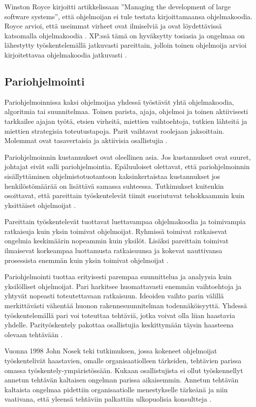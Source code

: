 \documentclass[finnish]{tktltiki2}
\theoremstyle{definition}
\theoremstyle{remark}
\begin{document}
Winston Royce kirjoitti artikkelissaan ''Managing the development of large software systems'', että ohjelmoijan ei tule testata kirjoittamaansa ohjelmakoodia. Royce arvioi, että useimmat virheet ovat ilmiselviä ja ovat löydettävissä katsomalla ohjelmakoodia \cite{ROY70}. XP:ssä tämä on hyväksytty tosiasia ja ongelmaa on lähestytty työskentelemällä jatkuvasti pareittain, jolloin toinen ohjelmoija arvioi kirjoitettavaa ohjelmakoodia jatkuvasti \cite{BEC99}. 

\subsection{Pariohjelmointi}

Pariohjelmoinnissa kaksi ohjelmoijaa yhdessä työstävät yhtä ohjelmakoodia, algoritmia tai suunnitelmaa. Toinen parista, ajaja, ohjelmoi ja toinen aktiivisesti tarkkailee ajajan työtä, etsien virheitä, miettien vaihtoehtoja, tutkien lähteitä ja miettien strategisia toteutustapoja. Parit vaihtavat roolejaan jaksoittain. Molemmat ovat tasavertaisia ja aktiivisia osallistujia \cite{WIL00}.

Pariohjelmoinnin kustannukset ovat oleellinen asia. Jos kustannukset ovat suuret, johtajat eivät salli pariohjelmointia. Epäluuloiset olettavat, että pariohjelmoinnin sisällyttäminen ohjelmistotuotantoon kaksinkertaistaa kustannukset jos henkilöstömäärää on lisättävä samassa suhteessa. Tutkimukset kuitenkin osoittavat, että pareittain työskentelevät tiimit suoriutuvat tehokkaammin kuin yksittäiset ohjelmoijat \cite{NOS98} \cite{WIL00}.

Pareittain työskentelevät tuottavat luettavampaa ohjelmakoodia ja toimivampia ratkaisuja kuin yksin toimivat ohjelmoijat. Ryhmissä toimivat ratkaisevat ongelmia keskimäärin nopeammin kuin yksilöt. Lisäksi pareittain toimivat ilmaisevat korkeampaa luottamusta ratkaisuunsa ja kokevat nauttivansa prosessista enemmän kuin yksin toimivat ohjelmoijat \cite{NOS98}.   

Pariohjelmointi tuottaa erityisesti parempaa suunnittelua ja analyysia kuin yksilölliset ohjelmoijat. Pari harkitsee huomattavasti enemmän vaihtoehtoja ja yhtyvät nopeasti toteutettavaan ratkaisuun. Ideoiden vaihto parin välillä merkittävästi vähentää huonon rakennesuunnitelman todennäköisyyttä.  Yhdessä työskentelemällä pari voi toteuttaa tehtäviä, jotka voivat olla liian haastavia yhdelle. Parityöskentely pakottaa osallistujia keskittymään täysin haasteena olevaan tehtävään \cite{WIL00}.

Vuonna 1998 John Nosek teki tutkimuksen, jossa kokeneet ohjelmoijat työskentelivät haastavien, omalle organisaatiolleen tärkeiden, tehtävien parissa omassa työskentely-ympäristössään. Kukaan osallistujista ei ollut työskennellyt annetun tehtävän kaltaisen ongelman parissa aikaisemmin. Annetun tehtävän kaltaista ongelmaa pidettiin organisaatiolle menestykselle tärkeänä ja niin vaativana, että yleensä tehtäviin palkattiin ulkopuolisia konsultteja \cite{NOS98}.
\end{document}
